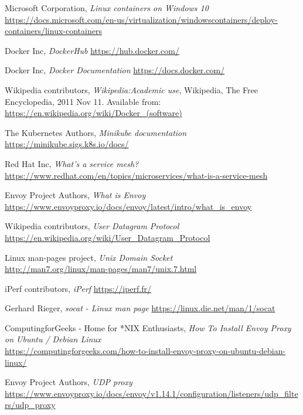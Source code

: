 \documentclass[a4paper,oneside]{article}
\begin{document}
\begin{thebibliography}{9}
\label{sec:tanulm-irod-jegyz}

 Microsoft Corporation, \emph{Linux containers on Windows 10} \\
\url{https://docs.microsoft.com/en-us/virtualization/windowscontainers/deploy-containers/linux-containers}

  Docker Inc, \emph{DockerHub} \url{https://hub.docker.com/}

  Docker Inc, \emph{Docker Documentation} \url{https://docs.docker.com/}

 Wikipedia contributors, \emph{Wikipedia:Academic
    use}, Wikipedia, The Free Encyclopedia, 2011 Nov 11.  Available
  from: \\ \url{https://en.wikipedia.org/wiki/Docker_(software)}

 The Kubernetes Authors, \emph{Minikube documentation} \url{https://minikube.sigs.k8s.io/docs/}

 Red Hat Inc, \emph{What's a service mesh?}
\\ \url{https://www.redhat.com/en/topics/microservices/what-is-a-service-mesh}

 Envoy Project Authors, \emph{What is Envoy}
\\ \url{https://www.envoyproxy.io/docs/envoy/latest/intro/what_is_envoy}

 Wikipedia contributors, \emph{User Datagram Protocol}
\\ \url{https://en.wikipedia.org/wiki/User_Datagram_Protocol}

  Linux man-pages project, \emph{Unix Domain Socket}
\\ \url{http://man7.org/linux/man-pages/man7/unix.7.html}

  iPerf contributors, \emph{iPerf} \url{https://iperf.fr/}

  Gerhard Rieger, \emph{socat - Linux man page} \url{https://linux.die.net/man/1/socat}

 ComputingforGeeks - Home for *NIX Enthusiasts, \emph{How To Install Envoy Proxy on Ubuntu / Debian Linux} \\
\url{https://computingforgeeks.com/how-to-install-envoy-proxy-on-ubuntu-debian-linux/}

 Envoy Project Authors, \emph{UDP proxy} \\
\url{https://www.envoyproxy.io/docs/envoy/v1.14.1/configuration/listeners/udp_filters/udp_proxy}


\end{thebibliography}
\end{document}
